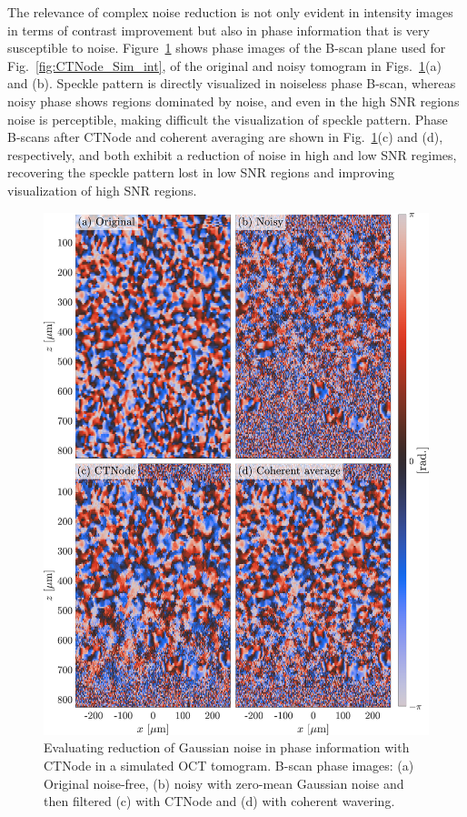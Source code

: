 The relevance of complex noise reduction is not only evident in intensity images in terms of contrast improvement but also in phase information that is very susceptible to noise. Figure~\ref{fig:CTNode_Sim_Phase} shows phase images of the B-scan plane used for Fig.~\ref{fig:CTNode_Sim_int}, of the original and noisy tomogram in Figs.~\ref{fig:CTNode_Sim_Phase}(a) and (b). Speckle pattern is directly visualized in noiseless phase B-scan, whereas noisy phase shows regions dominated by noise, and even in the high SNR regions noise is perceptible, making difficult the visualization of speckle pattern. Phase B-scans after CTNode and coherent averaging are shown in Fig.~\ref{fig:CTNode_Sim_Phase}(c) and (d), respectively, and both exhibit a reduction of noise in high and low SNR regimes, recovering the speckle pattern lost in low SNR regions and improving visualization of high SNR regions. 


\begin{figure}[htb!]
	\centering
	\includegraphics[width=.7\textwidth]{Figures/SHARP/CTNode_Sim_Phase.pdf}
	\caption[Evaluating reduction of Gaussian noise in phase information with CTNode in a simulated OCT tomogram.]{Evaluating reduction of Gaussian noise in phase information with CTNode in a simulated OCT tomogram. B-scan phase images: (a) Original noise-free, (b) noisy with zero-mean Gaussian noise and then filtered (c) with CTNode and (d) with coherent wavering.}
	\label{fig:CTNode_Sim_Phase}
\end{figure}

